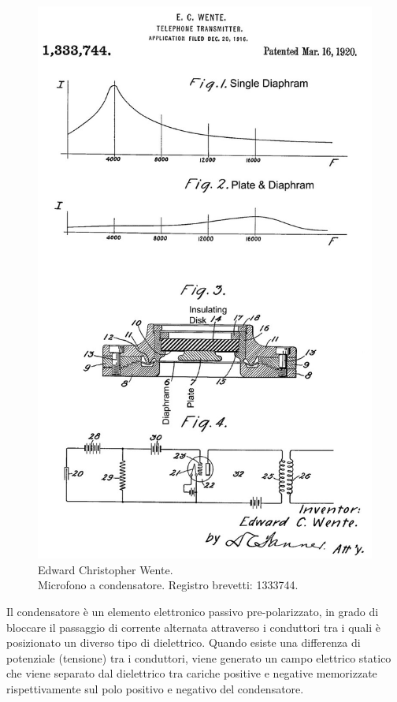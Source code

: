 \begin{refsection}
\begin{figure}[tbhp]
\centering
\includegraphics[width=0.99\columnwidth]{CAPITOLI/0200/img/US1333744-1b.jpg}
\caption[]{Edward Christopher Wente. \\ Microfono a condensatore. Registro brevetti: 1333744.}
\label{mic:wentemic}
\end{figure}

Il condensatore è un elemento elettronico passivo pre-polarizzato, in grado di
bloccare il passaggio di corrente alternata attraverso i conduttori tra i quali
è posizionato un diverso tipo di dielettrico. Quando esiste una differenza di
potenziale (tensione) tra i conduttori, viene generato un campo elettrico
statico che viene separato dal dielettrico tra cariche positive e negative
memorizzate rispettivamente sul polo positivo e negativo del condensatore.


\end{refsection}
